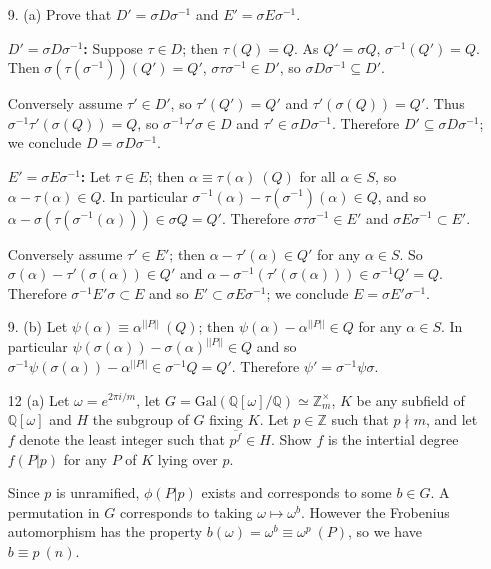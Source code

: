 \documentclass{article}
\newcommand{\w}[0]{\omega}
\newcommand{\Q}[0]{\mathbb{Q}}
\newcommand{\Z}[0]{\mathbb{Z}}
\newcommand{\modequiv}[3]{#1 \equiv #2\ (#3)}
\newcommand{\gal}[2]{\text{Gal}(#1 / #2)}
\begin{document}
\begin{enumerate}
\item[9. (a)] Prove that $D' = \sigma D \sigma^{-1}$ and $E' = \sigma E \sigma^{-1}$.

{\bf $D' = \sigma D \sigma^{-1}$:} Suppose $\tau \in D$; then $\tau(Q) = Q$.  As $Q' = \sigma Q$, $\sigma^{-1}(Q') = Q$.  Then $\sigma(\tau(\sigma^{-1}))(Q') = Q'$, $\sigma \tau \sigma^{-1} \in D'$, so $\sigma D \sigma^{-1} \subseteq D'$.

Conversely assume $\tau' \in D'$, so $\tau'(Q') = Q'$ and $\tau'(\sigma(Q)) = Q'$. Thus $\sigma^{-1} \tau'(\sigma(Q)) = Q$, so $\sigma^{-1} \tau' \sigma \in D$ and $\tau' \in \sigma D \sigma^{-1}$.  Therefore $D' \subseteq \sigma D \sigma^{-1}$; we conclude $D = \sigma D \sigma^{-1}$.

{\bf $E' = \sigma E \sigma^{-1}$: } Let $\tau \in E$; then $\modequiv{\alpha}{\tau(\alpha)}{Q}$ for all $\alpha \in S$, so $\alpha - \tau(\alpha) \in Q$.  In particular $\sigma^{-1}(\alpha) - \tau(\sigma^{-1})(\alpha) \in Q$, and so $\alpha - \sigma(\tau(\sigma^{-1}(\alpha))) \in \sigma Q = Q'$.  Therefore $\sigma \tau \sigma^{-1} \in E'$ and $\sigma E \sigma^{-1} \subset E'$.

Conversely assume $\tau' \in E'$; then $\alpha - \tau'(\alpha) \in Q'$ for any $\alpha \in S$.  So $\sigma(\alpha) - \tau'(\sigma(\alpha)) \in Q'$ and $\alpha - \sigma^{-1}(\tau'(\sigma(\alpha))) \in \sigma^{-1}Q' = Q$.  Therefore $\sigma^{-1} E' \sigma \subset E$ and so $E' \subset \sigma E \sigma^{-1}$; we conclude $E = \sigma E' \sigma^{-1}$.

\item [9. (b)] Let $\modequiv{\psi(\alpha)}{\alpha^{||P||}}{Q}$; then $\psi(\alpha) - \alpha^{||P||} \in Q$ for any $\alpha \in S$.  In particular $\psi(\sigma(\alpha)) - \sigma(\alpha)^{||P||} \in Q$ and so $\sigma^{-1}\psi(\sigma(\alpha)) - \alpha^{||P||} \in \sigma^{-1}Q = Q'$.  Therefore $\psi' = \sigma^{-1}\psi \sigma$.

\item [12 (a)]  Let $\w = e^{2\pi i / m}$, let $G = \gal{\Q[\omega]}{\Q} \simeq \Z^{\times}_{m}$, $K$ be any subfield of $\Q[\omega]$ and $H$ the subgroup of $G$ fixing $K$.  Let $p \in \Z$ such that $p \nmid m$, and let $f$ denote the least integer such that $\overline{p^f} \in H$.  Show $f$ is the intertial degree $f(P | p)$ for any $P$ of $K$ lying over $p$.

Since $p$ is unramified, $\phi(P | p)$ exists and corresponds to some $b \in G$.  A permutation in $G$ corresponds to taking $\w \mapsto \w^b$.  However the Frobenius automorphism has the property $b(\omega) = \modequiv{\w^{b}}{\w^{p}}{P}$, so we have $\modequiv{b}{p}{n}$.


\end{enumerate}
\end{document}

